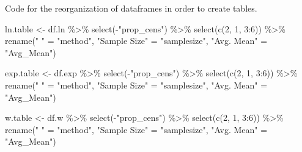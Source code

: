 \documentclass[12pt, twoside]{amherstthesis}
\newenvironment{Shaded}{\begin{snugshade}}{\end{snugshade}}
\newcommand{\DecValTok}[1]{\textcolor[rgb]{0.00,0.00,0.81}{#1}}
\newcommand{\FunctionTok}[1]{\textcolor[rgb]{0.00,0.00,0.00}{#1}}
\newcommand{\NormalTok}[1]{#1}
\newcommand{\OtherTok}[1]{\textcolor[rgb]{0.56,0.35,0.01}{#1}}
\newcommand{\SpecialCharTok}[1]{\textcolor[rgb]{0.00,0.00,0.00}{#1}}
\newcommand{\StringTok}[1]{\textcolor[rgb]{0.31,0.60,0.02}{#1}}
\begin{document}
Code for the reorganization of dataframes in order to create tables.
\begin{Shaded}
\begin{Highlighting}[]
\NormalTok{ln.table }\OtherTok{\textless{}{-}}\NormalTok{ df.ln }\SpecialCharTok{\%\textgreater{}\%}
  \FunctionTok{select}\NormalTok{(}\SpecialCharTok{{-}}\StringTok{"prop\_cens"}\NormalTok{) }\SpecialCharTok{\%\textgreater{}\%}
  \FunctionTok{select}\NormalTok{(}\FunctionTok{c}\NormalTok{(}\DecValTok{2}\NormalTok{, }\DecValTok{1}\NormalTok{, }\DecValTok{3}\SpecialCharTok{:}\DecValTok{6}\NormalTok{)) }\SpecialCharTok{\%\textgreater{}\%}
  \FunctionTok{rename}\NormalTok{(}\StringTok{" "} \OtherTok{=} \StringTok{"method"}\NormalTok{, }\StringTok{"Sample Size"} \OtherTok{=} \StringTok{"samplesize"}\NormalTok{, }
         \StringTok{"Avg. Mean"} \OtherTok{=} \StringTok{"Avg\_Mean"}\NormalTok{)}

\NormalTok{exp.table }\OtherTok{\textless{}{-}}\NormalTok{ df.exp }\SpecialCharTok{\%\textgreater{}\%}
  \FunctionTok{select}\NormalTok{(}\SpecialCharTok{{-}}\StringTok{"prop\_cens"}\NormalTok{) }\SpecialCharTok{\%\textgreater{}\%}
  \FunctionTok{select}\NormalTok{(}\FunctionTok{c}\NormalTok{(}\DecValTok{2}\NormalTok{, }\DecValTok{1}\NormalTok{, }\DecValTok{3}\SpecialCharTok{:}\DecValTok{6}\NormalTok{)) }\SpecialCharTok{\%\textgreater{}\%}
  \FunctionTok{rename}\NormalTok{(}\StringTok{" "} \OtherTok{=} \StringTok{"method"}\NormalTok{, }\StringTok{"Sample Size"} \OtherTok{=} \StringTok{"samplesize"}\NormalTok{, }
         \StringTok{"Avg. Mean"} \OtherTok{=} \StringTok{"Avg\_Mean"}\NormalTok{)}

\NormalTok{w.table }\OtherTok{\textless{}{-}}\NormalTok{ df.w }\SpecialCharTok{\%\textgreater{}\%}
  \FunctionTok{select}\NormalTok{(}\SpecialCharTok{{-}}\StringTok{"prop\_cens"}\NormalTok{) }\SpecialCharTok{\%\textgreater{}\%}
  \FunctionTok{select}\NormalTok{(}\FunctionTok{c}\NormalTok{(}\DecValTok{2}\NormalTok{, }\DecValTok{1}\NormalTok{, }\DecValTok{3}\SpecialCharTok{:}\DecValTok{6}\NormalTok{)) }\SpecialCharTok{\%\textgreater{}\%}
  \FunctionTok{rename}\NormalTok{(}\StringTok{" "} \OtherTok{=} \StringTok{"method"}\NormalTok{, }\StringTok{"Sample Size"} \OtherTok{=} \StringTok{"samplesize"}\NormalTok{, }
         \StringTok{"Avg. Mean"} \OtherTok{=} \StringTok{"Avg\_Mean"}\NormalTok{)}
\end{Highlighting}
\end{Shaded}
\end{document}
